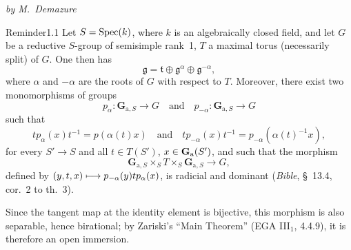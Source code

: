 \label{XX}
\begin{center}\textit{by M.~Demazure}\end{center}
\label{XX.sec.1}
{\renewcommand{\thefootnote}{(0)}}%
\begin{enoncerm}{Reminder}{1.1}\label{XX.1.1}
Let $S=\operatorname{Spec}(k)$, where $k$ is an algebraically closed field, and let $G$ be a reductive $S$-group of semisimple rank~1, $T$ a maximal torus (necessarily split) of $G$. One then has
\[
\mathfrak g=\mathfrak t\oplus\mathfrak g^\alpha\oplus\mathfrak g^{-\alpha},
\]
where $\alpha$ and $-\alpha$ are the roots of $G$ with respect to $T$. Moreover, there exist two monomorphisms of groups
\[
p_\alpha:\mathbf G_{\mathrm a,S}\to G\quad\text{and}\quad p_{-\alpha}:\mathbf G_{\mathrm a,S}\to G
\]
such that
\[
tp_\alpha(x)t^{-1}=p(\alpha(t)x)\quad\text{and}\quad tp_{-\alpha}(x)t^{-1}=p_{-\alpha}(\alpha(t)^{-1}x),
\]
for every $S'\to S$ and all $t\in T(S')$, $x\in\mathbf{G}_{\mathrm{a}}(S')$, and such that the morphism
\[
\mathbf G_{\mathrm a,S}\mathbin{\times_S}T\mathbin{\times_S}\mathbf G_{\mathrm a,S}\to G,
\]
defined by $(y,t,x)\longmapsto p_{-\alpha}(y)tp_\alpha(x)$, is radicial and dominant (\textit{Bible}, \S~13.4, cor.~2 to th.~3).

Since the tangent map at the identity element is bijective, this morphism is also separable, hence birational; by Zariski's ``Main Theorem'' (EGA III$_1$, 4.4.9), it is therefore an open immersion.
\end{enoncerm}

